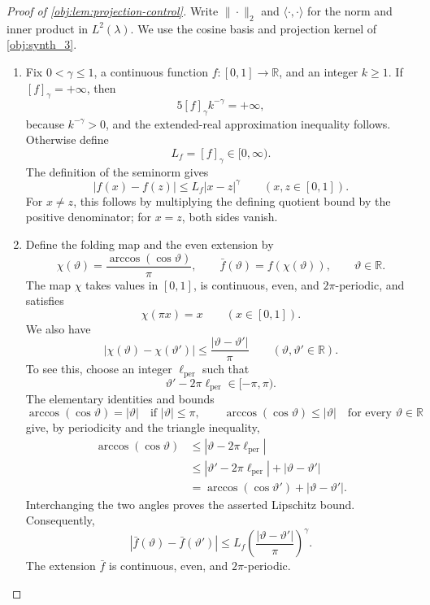 \begin{proof}[Proof of \cref{obj:lem:projection-control}]
Write \(\|\cdot\|_2\) and \(\langle\cdot,\cdot\rangle\) for the norm and inner product in \(L^2(\lambda)\). We use the cosine basis and projection kernel of \cref{obj:synth_3}.

\begin{enumerate}
\item Fix \(0<\gamma\le1\), a continuous function \(f:[0,1]\to\mathbb R\), and an integer \(k\ge1\). If \([f]_\gamma=+\infty\), then
\[
5[f]_\gamma k^{-\gamma}=+\infty,
\]
because \(k^{-\gamma}>0\), and the extended-real approximation inequality follows. Otherwise define
\[
L_f=[f]_\gamma\in[0,\infty).
\]
The definition of the seminorm gives
\[
|f(x)-f(z)|\le L_f|x-z|^\gamma
\qquad(x,z\in[0,1]).
\]
For \(x\ne z\), this follows by multiplying the defining quotient bound by the positive denominator; for \(x=z\), both sides vanish.

\item Define the folding map and the even extension by
\[
\chi(\vartheta)=\frac{\arccos(\cos\vartheta)}{\pi},
\qquad
\bar f(\vartheta)=f(\chi(\vartheta)),
\qquad \vartheta\in\mathbb R.
\]
The map \(\chi\) takes values in \([0,1]\), is continuous, even, and \(2\pi\)-periodic, and satisfies
\[
\chi(\pi x)=x\qquad(x\in[0,1]).
\]
We also have
\[
|\chi(\vartheta)-\chi(\vartheta')|
\le \frac{|\vartheta-\vartheta'|}{\pi}
\qquad(\vartheta,\vartheta'\in\mathbb R).
\]
To see this, choose an integer \(\ell_{\mathrm{per}}\) such that
\[
\vartheta'-2\pi\ell_{\mathrm{per}}\in[-\pi,\pi).
\]
The elementary identities and bounds
\[
\arccos(\cos\vartheta)=|\vartheta|
\quad\text{if }|\vartheta|\le\pi,
\qquad
\arccos(\cos\vartheta)\le|\vartheta|
\quad\text{for every }\vartheta\in\mathbb R
\]
give, by periodicity and the triangle inequality,
\[
\begin{aligned}
\arccos(\cos\vartheta)
&\le|\vartheta-2\pi\ell_{\mathrm{per}}|\\
&\le|\vartheta'-2\pi\ell_{\mathrm{per}}|
   +|\vartheta-\vartheta'|\\
&=\arccos(\cos\vartheta')+|\vartheta-\vartheta'|.
\end{aligned}
\]
Interchanging the two angles proves the asserted Lipschitz bound. Consequently,
\[
|\bar f(\vartheta)-\bar f(\vartheta')|
\le L_f\left(\frac{|\vartheta-\vartheta'|}{\pi}\right)^\gamma.
\]
The extension \(\bar f\) is continuous, even, and \(2\pi\)-periodic.


\end{enumerate}
\end{proof}
